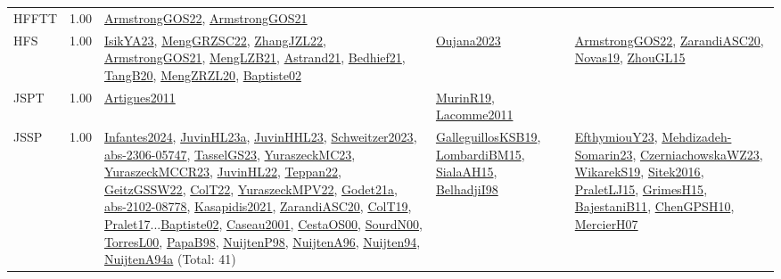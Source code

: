 {\begin{longtable}{p{3cm}r>{\raggedright\arraybackslash}p{6cm}>{\raggedright\arraybackslash}p{6cm}>{\raggedright\arraybackslash}p{8cm}}
\index{HFFTT}\index{Classification!HFFTT}HFFTT &  1.00 & \hyperref[detail:ArmstrongGOS22]{ArmstrongGOS22}, \hyperref[detail:ArmstrongGOS21]{ArmstrongGOS21} &  & \\
\index{HFS}\index{Classification!HFS}HFS &  1.00 & \hyperref[detail:IsikYA23]{IsikYA23}, \hyperref[detail:MengGRZSC22]{MengGRZSC22}, \hyperref[detail:ZhangJZL22]{ZhangJZL22}, \hyperref[detail:ArmstrongGOS21]{ArmstrongGOS21}, \hyperref[detail:MengLZB21]{MengLZB21}, \hyperref[detail:Astrand21]{Astrand21}, \hyperref[detail:Bedhief21]{Bedhief21}, \hyperref[detail:TangB20]{TangB20}, \hyperref[detail:MengZRZL20]{MengZRZL20}, \hyperref[detail:Baptiste02]{Baptiste02} & \hyperref[detail:Oujana2023]{Oujana2023} & \hyperref[detail:ArmstrongGOS22]{ArmstrongGOS22}, \hyperref[detail:ZarandiASC20]{ZarandiASC20}, \hyperref[detail:Novas19]{Novas19}, \hyperref[detail:ZhouGL15]{ZhouGL15}\\
\index{JSPT}\index{Classification!JSPT}JSPT &  1.00 & \hyperref[detail:Artigues2011]{Artigues2011} & \hyperref[detail:MurinR19]{MurinR19}, \hyperref[detail:Lacomme2011]{Lacomme2011} & \\
\index{JSSP}\index{Classification!JSSP}JSSP &  1.00 & \hyperref[detail:Infantes2024]{Infantes2024}, \hyperref[detail:JuvinHL23a]{JuvinHL23a}, \hyperref[detail:JuvinHHL23]{JuvinHHL23}, \hyperref[detail:Schweitzer2023]{Schweitzer2023}, \hyperref[detail:abs-2306-05747]{abs-2306-05747}, \hyperref[detail:TasselGS23]{TasselGS23}, \hyperref[detail:YuraszeckMC23]{YuraszeckMC23}, \hyperref[detail:YuraszeckMCCR23]{YuraszeckMCCR23}, \hyperref[detail:JuvinHL22]{JuvinHL22}, \hyperref[detail:Teppan22]{Teppan22}, \hyperref[detail:GeitzGSSW22]{GeitzGSSW22}, \hyperref[detail:ColT22]{ColT22}, \hyperref[detail:YuraszeckMPV22]{YuraszeckMPV22}, \hyperref[detail:Godet21a]{Godet21a}, \hyperref[detail:abs-2102-08778]{abs-2102-08778}, \hyperref[detail:Kasapidis2021]{Kasapidis2021}, \hyperref[detail:ZarandiASC20]{ZarandiASC20}, \hyperref[detail:ColT19]{ColT19}, \hyperref[detail:Pralet17]{Pralet17}...\hyperref[detail:Baptiste02]{Baptiste02}, \hyperref[detail:Caseau2001]{Caseau2001}, \hyperref[detail:CestaOS00]{CestaOS00}, \hyperref[detail:SourdN00]{SourdN00}, \hyperref[detail:TorresL00]{TorresL00}, \hyperref[detail:PapaB98]{PapaB98}, \hyperref[detail:NuijtenP98]{NuijtenP98}, \hyperref[detail:NuijtenA96]{NuijtenA96}, \hyperref[detail:Nuijten94]{Nuijten94}, \hyperref[detail:NuijtenA94a]{NuijtenA94a} (Total: 41) & \hyperref[detail:GalleguillosKSB19]{GalleguillosKSB19}, \hyperref[detail:LombardiBM15]{LombardiBM15}, \hyperref[detail:SialaAH15]{SialaAH15}, \hyperref[detail:BelhadjiI98]{BelhadjiI98} & \hyperref[detail:EfthymiouY23]{EfthymiouY23}, \hyperref[detail:Mehdizadeh-Somarin23]{Mehdizadeh-Somarin23}, \hyperref[detail:CzerniachowskaWZ23]{CzerniachowskaWZ23}, \hyperref[detail:WikarekS19]{WikarekS19}, \hyperref[detail:Sitek2016]{Sitek2016}, \hyperref[detail:PraletLJ15]{PraletLJ15}, \hyperref[detail:GrimesH15]{GrimesH15}, \hyperref[detail:BajestaniB11]{BajestaniB11}, \hyperref[detail:ChenGPSH10]{ChenGPSH10}, \hyperref[detail:MercierH07]{MercierH07}\\

\end{longtable}}
